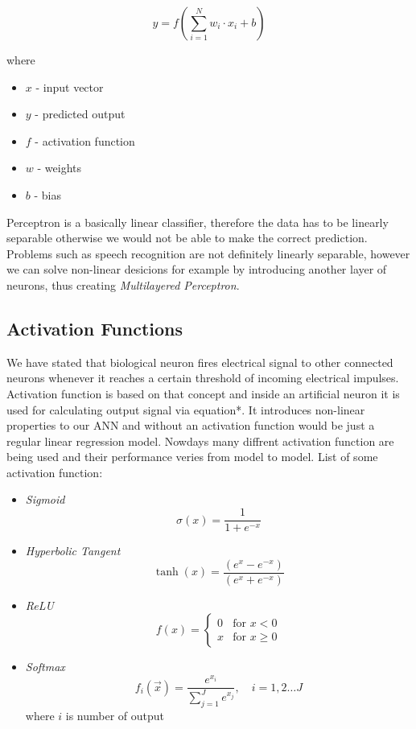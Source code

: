 \[ y = f(\sum_{i=1}^N w_i \cdot x_i + b) \]

where

\begin{itemize}
	\item $x$ - input vector
	\item $y$ - predicted output
  \item $f$ - activation function
	\item $w$ - weights
	\item $b$ - bias
\end{itemize}

Perceptron is a basically linear classifier, therefore the data has to be linearly separable otherwise we would not be able to make the correct prediction.
Problems such as speech recognition are not definitely linearly separable, however we can solve non-linear desicions for example by introducing another layer of neurons, thus creating \textit{Multilayered Perceptron}.

\subsection{Activation Functions}

We have stated that biological neuron fires electrical signal to other connected neurons whenever it reaches a certain threshold of incoming electrical impulses.
Activation function is based on that concept and inside an artificial neuron it is used for calculating output signal via equation*.
It introduces non-linear properties to our ANN and without an activation function would be just a regular linear regression model.
Nowdays many diffrent activation function are being used and their performance veries from model to model. \newline
\newline
List of some activation function:

\begin{itemize}
	\item \textit{Sigmoid} \[ \sigma(x)=\frac{1}{1+e^{-x}} \]
	\item \textit{Hyperbolic Tangent} \[ \tanh(x)=\frac{(e^{x} - e^{-x})}{(e^{x} + e^{-x})} \]
  \item \textit{ReLU}  \[ f(x) = \begin{cases} 0 & \text{for } x < 0 \\ x & \text{for } x \ge 0\end{cases} \]
  \item \textit{Softmax} \[ f_i(\vec{x}) = \frac{e^{x_i}}{\sum_{j=1}^J e^{x_j}}, \quad i = 1, 2 \ldots J \]
    where $i$ is number of output
\end{itemize}

